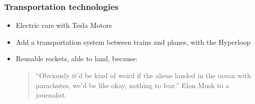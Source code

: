 \begin{frame}
\frametitle{Transportation technologies}
\begin{itemize}
    \itemsep1em
    \item Electric cars with Tesla Motors
    \item Add a transportation system between trains and planes, with the
        Hyperloop
    \item Reusable rockets, able to land, because:
        \begin{quote}
            ``Obviously it'd be kind of weird if the aliens landed in the ocean
            with parachutes, we'd be like okay, nothing to fear.'' Elon Musk to
            a journalist.
        \end{quote}
\end{itemize}
\end{frame}
